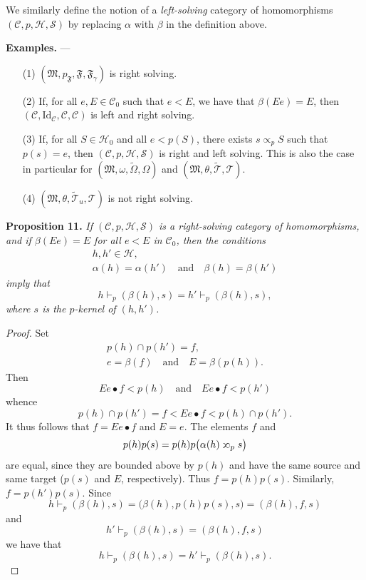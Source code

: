 \documentclass[a4paper,oneside,nobib,nofonts,notitlepage,notoc,nols,fleqn,justified]{tufte-book}
\newenvironment{itenv}[1]
  {\phantomsection\par\medskip\noindent\textbf{#1.}\itshape}
  {\par\medskip}
\newenvironment{rmenv}[1]
  {\phantomsection\par\medskip\noindent\textbf{#1.}\rmfamily}
  {\par\medskip}
\newcommand{\oldpage}[1]{{\reversemarginpar\marginnote{\raggedleft\footnotesize\textit{p.~#1}}}}
\newcommand{\CC}{\mathcal{C}}
\newcommand{\HH}{\mathcal{H}}
\renewcommand{\SS}{\mathcal{S}}
\newcommand{\MM}{\mathfrak{M}}
\newcommand{\FF}{\mathfrak{F}}
\newcommand{\TT}{\mathcal{T}}
\newcommand{\subs}{\mathrel{\propto}}
\newcommand{\sups}{\mathrel{\reflectbox{$\propto$}}}
\newcommand{\Id}{\mathrm{Id}}
\begin{document}
We similarly define the notion of a \emph{left-solving} category of homomorphisms $(\CC,p,\HH,\SS)$ by replacing $\alpha$ with $\beta$ in the definition above.

\begin{rmenv}{Examples}
  ---
  \begin{enumerate}
    \item [\normalfont(1)]
      $(\MM,p_\FF,\FF,\FF_\gamma)$ is right solving.

    \item [\normalfont(2)]
      If, for all $e,E\in\CC_0$ such that $e<E$, we have that $\beta(Ee)=E$, then $(\CC,\Id_\CC,\CC,\CC)$ is left and right solving.

    \item[\normalfont(3)]
      If, for all $S\in\HH_0$ and all $e<p(S)$, there exists $s\subs_p S$ such that $p(s)=e$, then $(\CC,p,\HH,\SS)$ is right and left solving.
      This is also the case in particular for $(\MM,\omega,\widetilde{\Omega},\Omega)$ and $(\MM,\theta,\widetilde{\TT},\TT)$.

    \item[\normalfont(4)]
      \oldpage{370}
      $(\MM,\theta,\widetilde{\TT}_u,\TT)$ is not right solving.
  \end{enumerate}
\end{rmenv}

\begin{itenv}{Proposition 11}
\label{proposition:i-11}
  If $(\CC,p,\HH,\SS)$ is a right-solving category of homomorphisms, and if $\beta(Ee)=E$ for all $e<E$ in $\CC_0$, then the conditions
  \[
    \begin{gathered}
      h,h'\in\HH,
    \\\alpha(h)=\alpha(h')
      \quad\text{and}\quad
      \beta(h)=\beta(h')
    \end{gathered}
  \]
  imply that
  \[
    h\vdash_p(\beta(h),s)
    = h'\vdash_p(\beta(h),s),
  \]
  where $s$ is the $p$-kernel of $(h,h')$.
\end{itenv}

\begin{proof}
  Set
  \[
    \begin{gathered}
      p(h)\cap p(h')=f,
    \\e=\beta(f)
      \quad\text{and}\quad
      E=\beta(p(h)).
    \end{gathered}
  \]
  Then
  \[
    Ee\bullet f<p(h)
    \quad\text{and}\quad
    Ee\bullet f<p(h')
  \]
  whence
  \[
    p(h)\cap p(h')
    = f
    < Ee\bullet f
    < p(h)\cap p(h').
  \]
  It thus follows that $f=Ee\bullet f$ and $E=e$.
  The elements $f$ and
  \[
    p(h)p(s)
    = p(h)p\big(
      \alpha(h)\sups_p s
    \big)
  \]
  are equal, since they are bounded above by $p(h)$ and have the same source and same target ($p(s)$ and $E$, respectively).
  Thus $f=p(h)p(s)$.
  Similarly, $f=p(h')p(s)$.
  Since
  \[
    h\vdash_p(\beta(h),s)
    = \big(
      \beta(h), p(h)p(s), s
    \big)
    = (\beta(h),f,s)
  \]
  and
  \[
    h'\vdash_p(\beta(h),s)
    = (\beta(h),f,s)
  \]
  we have that
  \[
    h\vdash_p(\beta(h),s)
    = h'\vdash_p(\beta(h),s).
  \]
\end{proof}
\end{document}
